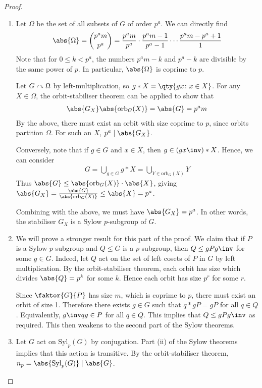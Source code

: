 \begin{proof}
	\begin{enumerate}
		\item Let $\Omega$ be the set of all subsets of $G$ of order $p^a$.
		      We can directly find
		      \begin{align*}
			      \abs{\Omega} = \binom{p^a m}{p^a} = \frac{p^a m}{p^a} \cdot \frac{p^a m - 1}{p^a - 1} \cdots \frac{p^a m - p^a + 1}{1}
		      \end{align*}
		      Note that for $0 \leq k < p^a$, the numbers $p^a m - k$ and $p^a - k$ are divisible by the same power of $p$.
		      In particular, $\abs{\Omega}$ is coprime to $p$.

		      Let $G \curvearrowright \Omega$ by left-multiplication, so $g \ast X = \qty{gx \colon x \in X}$.
		      For any $X \in \Omega$, the orbit-stabiliser theorem can be applied to show that
		      \begin{align*}
			      \abs{G_X} \abs{\mathrm{orb}_G(X)} = \abs{G} = p^a m
		      \end{align*}
		      By the above, there must exist an orbit with size coprime to $p$, since orbits partition $\Omega$.
		      For such an $X$, $p^a \mid \abs{G_X}$.

		      Conversely, note that if $g \in G$ and $x \in X$, then $g \in (gx\inv) \ast X$.
		      Hence, we can consider
		      \begin{align*}
			      G = \bigcup_{g \in G} g \ast X = \bigcup_{Y \in \mathrm{orb}_G(X)} Y
		      \end{align*}
		      Thus $\abs{G} \leq \abs{\mathrm{orb}_G(X)} \cdot \abs{X}$, giving $\abs{G_X} = \frac{\abs{G}}{\abs{\mathrm{orb}_G(X)}} \leq \abs{X} = p^a$.

		      Combining with the above, we must have $\abs{G_X} = p^a$.
		      In other words, the stabiliser $G_X$ is a Sylow $p$-subgroup of $G$.
		\item We will prove a stronger result for this part of the proof.
		      We claim that if $P$ is a Sylow $p$-subgroup and $Q \leq G$ is a $p$-subgroup, then $Q \leq g P g\inv$ for some $g \in G$.
		      Indeed, let $Q$ act on the set of left cosets of $P$ in $G$ by left multiplication.
		      By the orbit-stabiliser theorem, each orbit has size which divides $\abs{Q} = p^k$ for some $k$.
		      Hence each orbit has size $p^r$ for some $r$.

		      Since $\faktor{G}{P}$ has size $m$, which is coprime to $p$, there must exist an orbit of size 1.
		      Therefore there exists $g \in G$ such that $q \ast gP = gP$ for all $q \in Q$.
		      Equivalently, $g\inv q g \in P$ for all $q \in Q$.
		      This implies that $Q \leq gPg\inv$ as required.
		      This then weakens to the second part of the Sylow theorems.
		\item Let $G$ act on $\mathrm{Syl}_p(G)$ by conjugation.
		      Part (ii) of the Sylow theorems implies that this action is transitive.
		      By the orbit-stabiliser theorem, $n_p = \abs{\mathrm{Syl}_p(G)} \mid \abs{G}$.


\end{enumerate}
\end{proof}
